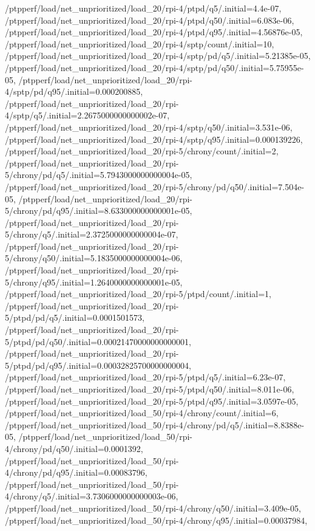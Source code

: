 {    /ptpperf/load/net_unprioritized/load_20/rpi-4/ptpd/q5/.initial=4.4e-07,
    /ptpperf/load/net_unprioritized/load_20/rpi-4/ptpd/q50/.initial=6.083e-06,
    /ptpperf/load/net_unprioritized/load_20/rpi-4/ptpd/q95/.initial=4.56876e-05,
    /ptpperf/load/net_unprioritized/load_20/rpi-4/sptp/count/.initial=10,
    /ptpperf/load/net_unprioritized/load_20/rpi-4/sptp/pd/q5/.initial=5.21385e-05,
    /ptpperf/load/net_unprioritized/load_20/rpi-4/sptp/pd/q50/.initial=5.75955e-05,
    /ptpperf/load/net_unprioritized/load_20/rpi-4/sptp/pd/q95/.initial=0.000200885,
    /ptpperf/load/net_unprioritized/load_20/rpi-4/sptp/q5/.initial=2.2675000000000002e-07,
    /ptpperf/load/net_unprioritized/load_20/rpi-4/sptp/q50/.initial=3.531e-06,
    /ptpperf/load/net_unprioritized/load_20/rpi-4/sptp/q95/.initial=0.000139226,
    /ptpperf/load/net_unprioritized/load_20/rpi-5/chrony/count/.initial=2,
    /ptpperf/load/net_unprioritized/load_20/rpi-5/chrony/pd/q5/.initial=5.7943000000000004e-05,
    /ptpperf/load/net_unprioritized/load_20/rpi-5/chrony/pd/q50/.initial=7.504e-05,
    /ptpperf/load/net_unprioritized/load_20/rpi-5/chrony/pd/q95/.initial=8.633000000000001e-05,
    /ptpperf/load/net_unprioritized/load_20/rpi-5/chrony/q5/.initial=2.3725000000000004e-07,
    /ptpperf/load/net_unprioritized/load_20/rpi-5/chrony/q50/.initial=5.1835000000000004e-06,
    /ptpperf/load/net_unprioritized/load_20/rpi-5/chrony/q95/.initial=1.2640000000000001e-05,
    /ptpperf/load/net_unprioritized/load_20/rpi-5/ptpd/count/.initial=1,
    /ptpperf/load/net_unprioritized/load_20/rpi-5/ptpd/pd/q5/.initial=0.0001501573,
    /ptpperf/load/net_unprioritized/load_20/rpi-5/ptpd/pd/q50/.initial=0.00021470000000000001,
    /ptpperf/load/net_unprioritized/load_20/rpi-5/ptpd/pd/q95/.initial=0.00032825700000000004,
    /ptpperf/load/net_unprioritized/load_20/rpi-5/ptpd/q5/.initial=6.23e-07,
    /ptpperf/load/net_unprioritized/load_20/rpi-5/ptpd/q50/.initial=8.011e-06,
    /ptpperf/load/net_unprioritized/load_20/rpi-5/ptpd/q95/.initial=3.0597e-05,
    /ptpperf/load/net_unprioritized/load_50/rpi-4/chrony/count/.initial=6,
    /ptpperf/load/net_unprioritized/load_50/rpi-4/chrony/pd/q5/.initial=8.8388e-05,
    /ptpperf/load/net_unprioritized/load_50/rpi-4/chrony/pd/q50/.initial=0.0001392,
    /ptpperf/load/net_unprioritized/load_50/rpi-4/chrony/pd/q95/.initial=0.00083796,
    /ptpperf/load/net_unprioritized/load_50/rpi-4/chrony/q5/.initial=3.7306000000000003e-06,
    /ptpperf/load/net_unprioritized/load_50/rpi-4/chrony/q50/.initial=3.409e-05,
    /ptpperf/load/net_unprioritized/load_50/rpi-4/chrony/q95/.initial=0.00037984,
}
